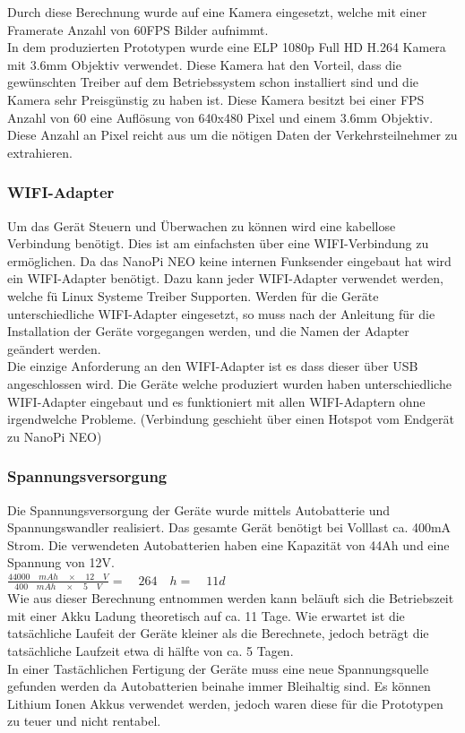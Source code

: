 Durch diese Berechnung wurde auf eine Kamera eingesetzt, welche mit einer Framerate Anzahl von 60FPS Bilder aufnimmt. \\
In dem produzierten Prototypen wurde eine ELP 1080p Full HD H.264 Kamera mit 3.6mm Objektiv verwendet. 
Diese Kamera hat den Vorteil, dass die gewünschten Treiber auf dem Betriebssystem schon installiert sind und die Kamera sehr Preisgünstig zu haben ist. Diese Kamera besitzt bei einer FPS Anzahl von 60 eine Auflösung von 640x480 Pixel und einem 3.6mm Objektiv. Diese Anzahl an Pixel reicht aus um die nötigen Daten der Verkehrsteilnehmer zu extrahieren.

\subsubsection{WIFI-Adapter}
Um das Ger\"at Steuern und \"Uberwachen zu können wird eine kabellose Verbindung benötigt. Dies ist am einfachsten über eine WIFI-Verbindung zu erm\"oglichen. Da das NanoPi NEO keine internen Funksender eingebaut hat wird ein WIFI-Adapter ben\"otigt. Dazu kann jeder WIFI-Adapter verwendet werden, welche f\"u Linux Systeme Treiber Supporten. Werden f\"ur die Ger\"ate unterschiedliche WIFI-Adapter eingesetzt, so muss nach der Anleitung f\"ur die Installation der Ger\"ate vorgegangen werden, und die Namen der Adapter ge\"andert werden.\\
Die einzige Anforderung an den WIFI-Adapter ist es dass dieser \"uber USB angeschlossen wird. Die Ger\"ate welche produziert wurden haben unterschiedliche WIFI-Adapter eingebaut und es funktioniert mit allen WIFI-Adaptern ohne irgendwelche Probleme. (Verbindung geschieht über einen Hotspot vom Endgerät zu NanoPi NEO)

\subsubsection{Spannungsversorgung}
Die Spannungsversorgung der Ger\"ate wurde mittels Autobatterie und Spannungswandler realisiert. Das gesamte Ger\"at ben\"otigt bei Volllast ca. 400mA Strom. Die verwendeten Autobatterien haben eine Kapazit\"at von 44Ah und eine Spannung von 12V. \\

$\frac { 44000\quad mAh\quad \times \quad 12\quad V }{ 400\quad mAh\quad \times \quad 5\quad V } =\quad 264\quad h=\quad 11d$ \\

Wie aus dieser Berechnung entnommen werden kann bel\"auft sich die Betriebszeit mit einer Akku Ladung theoretisch auf ca. 11 Tage. Wie erwartet ist die tats\"achliche Laufeit der Ger\"ate kleiner als die Berechnete, jedoch betr\"agt die tats\"achliche Laufzeit etwa di h\"alfte von ca. 5 Tagen. \\
In einer Tast\"achlichen Fertigung der Ger\"ate muss eine neue Spannungsquelle gefunden werden da Autobatterien beinahe immer Bleihaltig sind. Es können Lithium Ionen Akkus verwendet werden, jedoch waren diese f\"ur die Prototypen zu teuer und nicht rentabel. 

